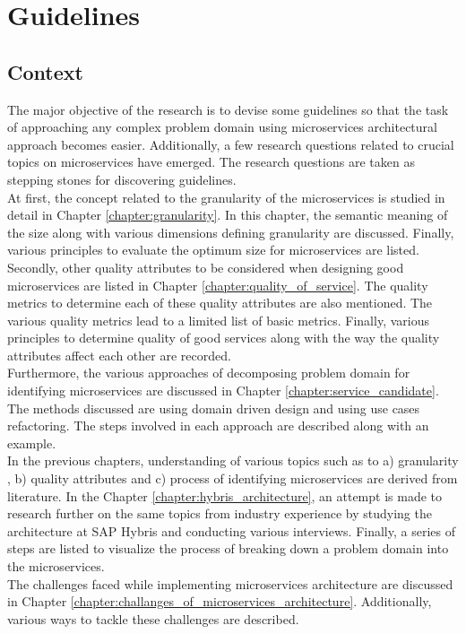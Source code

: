 \chapter{Guidelines}\label{chapter:guidelines}
\section{Context}\label{section:guidelines/context}
The major objective of the research is to devise some guidelines so that the task of approaching any complex problem domain using microservices architectural approach becomes easier. Additionally, a few research questions related to crucial topics on microservices have emerged. The research questions are taken as stepping stones for discovering guidelines.
\\
At first, the concept related to the granularity of the microservices is studied in detail in Chapter \ref{chapter:granularity}. In this chapter, the semantic meaning of the size along with various dimensions defining granularity are discussed. Finally, various principles to evaluate the optimum size for microservices are listed.
\\
Secondly, other quality attributes to be considered when designing good microservices are listed in Chapter \ref{chapter:quality_of_service}. The quality metrics to determine each of these quality attributes are also mentioned. The various quality metrics lead to a limited list of basic metrics. Finally, various principles to determine quality of good services along with the way the quality attributes affect each other are recorded.
\\
Furthermore, the various approaches of decomposing problem domain for identifying microservices are discussed in Chapter \ref{chapter:service_candidate}. The methods discussed are using domain driven design and using use cases refactoring. The steps involved in each approach are described along with an example.
\\
In the previous chapters, understanding of various topics such as to a) granularity , b) quality attributes and c) process of identifying microservices are derived from literature. In the Chapter \ref{chapter:hybris_architecture}, an attempt is made to research further on the same topics from industry experience by studying the architecture at SAP Hybris and conducting various interviews. Finally, a series of steps are listed to visualize the process of breaking down a problem domain into the microservices.
\\
The challenges faced while implementing microservices architecture are discussed in Chapter \ref{chapter:challanges_of_microservices_architecture}. Additionally, various ways to tackle these challenges are described.

